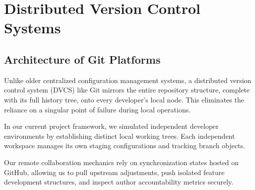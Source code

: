 \section{Distributed Version Control Systems}
\subsection{Architecture of Git Platforms}

Unlike older centralized configuration management systems, a distributed version 
control system (DVCS) like Git mirrors the entire repository structure, complete with 
its full history tree, onto every developer's local node. This eliminates the reliance 
on a singular point of failure during local operations.

In our current project framework, we simulated independent developer environments 
by establishing distinct local working trees. Each independent workspace manages its own 
staging configurations and tracking branch objects. 

Our remote collaboration mechanics rely on synchronization states hosted on GitHub, allowing 
us to pull upstream adjustments, push isolated feature development structures, and inspect 
author accountability metrics securely.
